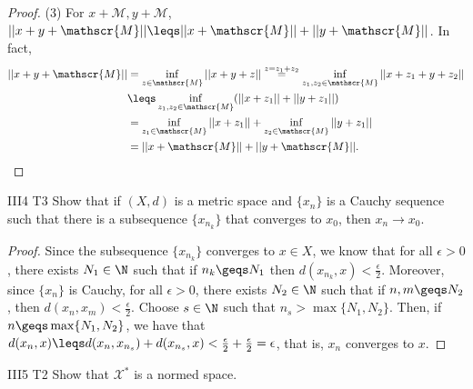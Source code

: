 \begin{proof}
    (3) For $x+\mathscr{M},y+\mathscr{M}$, $||x+y+\mathscr{M}||\leqs ||x+\mathscr{M}||+||y+\mathscr{M}||$. In fact,
    \begin{align*}
        ||x+y+\mathscr{M}||&=\inf_{z\in \mathscr{M}}||x+y+z||\overset{z=z_1+z_2}{=}\inf_{z_1,z_2\in \mathscr{M}}||x+z_1+y+z_2||\\
                        &\leqs \inf_{z_1,z_2\in \mathscr{M}} (||x+z_1||+||y+z_1||)\\
                        &=\inf_{z_1\in\mathscr{M}}||x+z_1|| + \inf_{z_2\in\mathscr{M}}||y+z_1||\\
                        &= ||x+\mathscr{M}||+||y+\mathscr{M}||.
    \end{align*}


\end{proof}

\begin{exercise}{III4 T3}{}
    Show that if $(X,d)$ is a metric space and $\{x_n\}$ is a Cauchy sequence such that
    there is a subsequence $\{x_{n_k}\}$ that converges to $x_0$, then $x_n\rightarrow x_0$.
\end{exercise}
\begin{proof}
    Since the subsequence $\{x_{n_k}\}$ converges to $x\in X$, we know that for all $\epsilon>0$,
    there exists $N_1\in\N$ such that if $n_k\geqs N_1$ then $d(x_{n_k},x)<\frac{\epsilon}{2}$.
    Moreover, since $\{x_n\}$ is Cauchy, for all $\epsilon>0$,
    there exists $N_2\in\N$ such that if $n,m\geqs N_2$, then $d(x_n,x_m)<\frac{\epsilon}{2}$.
    Choose $s\in\N$ such that $n_s>\max \{N_1,N_2\}$.
    Then, if $n\geqs \max \{N_1,N_2\}$, we have that 
    $d(x_n,x)\leqs d(x_n,x_{n_s})+d(x_{n_s},x)<\frac{\epsilon}{2}+\frac{\epsilon}{2}=\epsilon$,
    that is, $x_n$ converges to $x$.
\end{proof}

\begin{exercise}{III5 T2}{}
    Show that $\mathscr{X}^*$ is a normed space.
\end{exercise}

